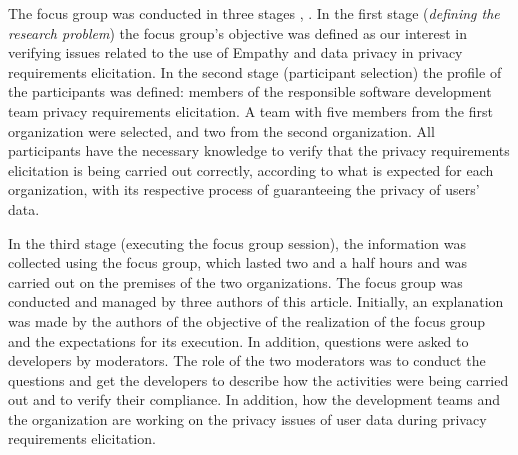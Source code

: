 \documentclass[conference]{IEEEtran}
\begin{document}
The focus group was conducted in three stages \cite{DBLP:conf/isese/KontioLB04}, \cite{DBLP:conf/se/BrauerPSK20}. In the first stage (\emph{defining the research problem}) the focus group's objective was defined as our interest in verifying issues related to the use of Empathy and data privacy in privacy requirements elicitation. In the second stage (participant selection) the profile of the participants was defined: members of the responsible software development team privacy requirements elicitation. A team with five members from the first organization were selected, and two from the second organization. All participants have the necessary knowledge to verify that the privacy requirements elicitation is being carried out correctly, according to what is expected for each organization, with its respective process of guaranteeing the privacy of users' data.


In the third stage (executing the focus group session), the information was collected using the focus group, which lasted two and a half hours and was carried out on the premises of the two organizations. The focus group was conducted and managed by three authors of this article. Initially, an explanation was made by the authors of the objective of the realization of the focus group and the expectations for its execution. In addition, questions were asked to developers by moderators. The role of the two moderators was to conduct the questions and get the developers to describe how the activities were being carried out and to verify their compliance. In addition, how the development teams and the organization are working on the privacy issues of user data during privacy requirements elicitation.
\end{document}
